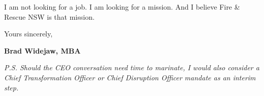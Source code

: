 \documentclass[11pt,a4paper]{article}
\begin{document}
I am not looking for a job. I am looking for a mission. And I believe Fire \& Rescue NSW is that mission.

Yours sincerely,

\vspace{8pt}
\textbf{Brad Widejaw, MBA}

\vspace{8pt}
\textit{P.S. Should the CEO conversation need time to marinate, I would also consider a Chief Transformation Officer or Chief Disruption Officer mandate as an interim step.}
\end{document}

